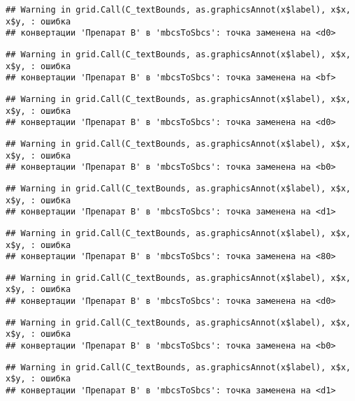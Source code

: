 \documentclass[
]{article}
\begin{document}
\begin{verbatim}
## Warning in grid.Call(C_textBounds, as.graphicsAnnot(x$label), x$x, x$y, : ошибка
## конвертации 'Препарат B' в 'mbcsToSbcs': точка заменена на <d0>
\end{verbatim}

\begin{verbatim}
## Warning in grid.Call(C_textBounds, as.graphicsAnnot(x$label), x$x, x$y, : ошибка
## конвертации 'Препарат B' в 'mbcsToSbcs': точка заменена на <bf>
\end{verbatim}

\begin{verbatim}
## Warning in grid.Call(C_textBounds, as.graphicsAnnot(x$label), x$x, x$y, : ошибка
## конвертации 'Препарат B' в 'mbcsToSbcs': точка заменена на <d0>
\end{verbatim}

\begin{verbatim}
## Warning in grid.Call(C_textBounds, as.graphicsAnnot(x$label), x$x, x$y, : ошибка
## конвертации 'Препарат B' в 'mbcsToSbcs': точка заменена на <b0>
\end{verbatim}

\begin{verbatim}
## Warning in grid.Call(C_textBounds, as.graphicsAnnot(x$label), x$x, x$y, : ошибка
## конвертации 'Препарат B' в 'mbcsToSbcs': точка заменена на <d1>
\end{verbatim}

\begin{verbatim}
## Warning in grid.Call(C_textBounds, as.graphicsAnnot(x$label), x$x, x$y, : ошибка
## конвертации 'Препарат B' в 'mbcsToSbcs': точка заменена на <80>
\end{verbatim}

\begin{verbatim}
## Warning in grid.Call(C_textBounds, as.graphicsAnnot(x$label), x$x, x$y, : ошибка
## конвертации 'Препарат B' в 'mbcsToSbcs': точка заменена на <d0>
\end{verbatim}

\begin{verbatim}
## Warning in grid.Call(C_textBounds, as.graphicsAnnot(x$label), x$x, x$y, : ошибка
## конвертации 'Препарат B' в 'mbcsToSbcs': точка заменена на <b0>
\end{verbatim}

\begin{verbatim}
## Warning in grid.Call(C_textBounds, as.graphicsAnnot(x$label), x$x, x$y, : ошибка
## конвертации 'Препарат B' в 'mbcsToSbcs': точка заменена на <d1>
\end{verbatim}
\end{document}
